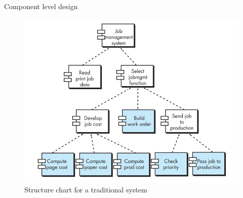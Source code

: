 \documentclass{beamer}
\begin{document}
\begin{frame}{Component level design }
	\begin{figure}
	\includegraphics[scale=.46]{img/m2_47.jpg}
	\caption{Structure chart for a traditional system}
\end{figure}
\end{frame}
\end{document}
